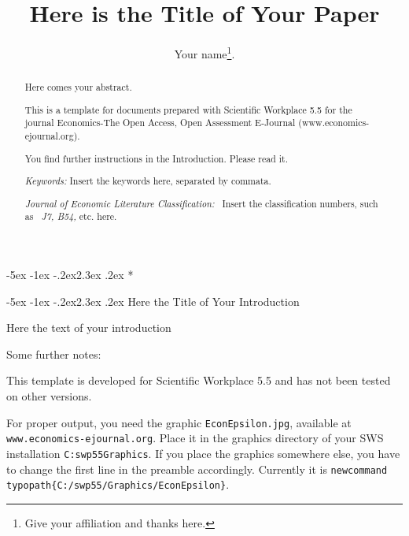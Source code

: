 \documentclass[12pt,a4paper,english,fleqn]{article}
\makeatletter
\renewcommand\section{\@startsection{section}{1}{\z@}
{-5ex \@plus -1ex \@minus -.2ex}{2.3ex \@plus.2ex}
 {\normalfont\large\bf}}
\makeatother
\begin{document}
\date{}
\title{\noindent Here is the Title of Your Paper}
\author{Your name\thanks{%
Give your affiliation and thanks here.}.}
\maketitle

\begin{abstract}
\noindent Here comes your abstract.

This is a template for documents prepared with Scientific Workplace 5.5 for
the journal Economics-The Open Access, Open Assessment E-Journal
(www.economics-ejournal.org).

You find further instructions in the Introduction. Please read it.

\noindent \medskip{}

\noindent \emph{Keywords: }Insert the keywords here, separated by commata.

\noindent \emph{Journal of Economic Literature Classification: }\ Insert the
classification numbers, such as \emph{\ J7, B54, }etc. here.
\end{abstract}

\noindent \newpage

\section*{\noindent}

\section{Here the Title of Your Introduction}

\noindent Here the text of your introduction

Some further notes:

This template is developed for Scientific Workplace 5.5 and has not been
tested on other versions.

For proper output, you need the graphic \texttt{EconEpsilon.jpg}, available
at \texttt{www.economics-ejournal.org}. Place it in the graphics directory
of your SWS installation \texttt{C:\TEXTsymbol{\backslash}swp55\TEXTsymbol{%
\backslash}Graphics\TEXTsymbol{\backslash}}. If you place the graphics
somewhere else, you have to change the first line in the preamble
accordingly. Currently it is\newline
\texttt{\TEXTsymbol{\backslash}newcommand\TEXTsymbol{\backslash}%
typopath\{C:/swp55/Graphics/EconEpsilon\}}.
\end{document}
